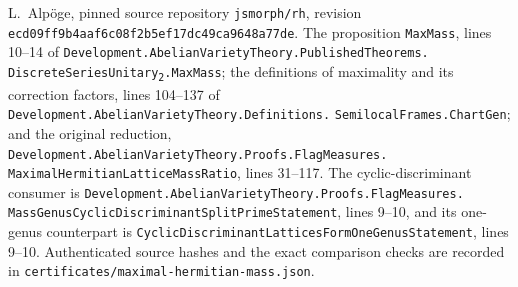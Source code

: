 L.~Alp\"oge, pinned source repository \texttt{jsmorph/rh},
revision \texttt{ecd09ff9b4aaf6c08f2b5ef17dc49ca9648a77de}.
The proposition \texttt{MaxMass}, lines 10--14 of
\texttt{Development.AbelianVarietyTheory.PublishedTheorems.}
\texttt{DiscreteSeriesUnitary\textsubscript{2}.MaxMass};
the definitions of maximality and its correction factors, lines
104--137 of
\texttt{Development.AbelianVarietyTheory.Definitions.}
\texttt{SemilocalFrames.ChartGen}; and the original reduction,
\texttt{Development.AbelianVarietyTheory.Proofs.FlagMeasures.}
\texttt{MaximalHermitianLatticeMassRatio}, lines 31--117.
The cyclic-discriminant consumer is
\texttt{Development.AbelianVarietyTheory.Proofs.FlagMeasures.}
\texttt{MassGenusCyclicDiscriminantSplitPrimeStatement}, lines 9--10,
and its one-genus counterpart is
\texttt{CyclicDiscriminantLatticesFormOneGenusStatement}, lines 9--10.
Authenticated source hashes and the exact comparison checks are
recorded in \texttt{certificates/maximal-hermitian-mass.json}.
